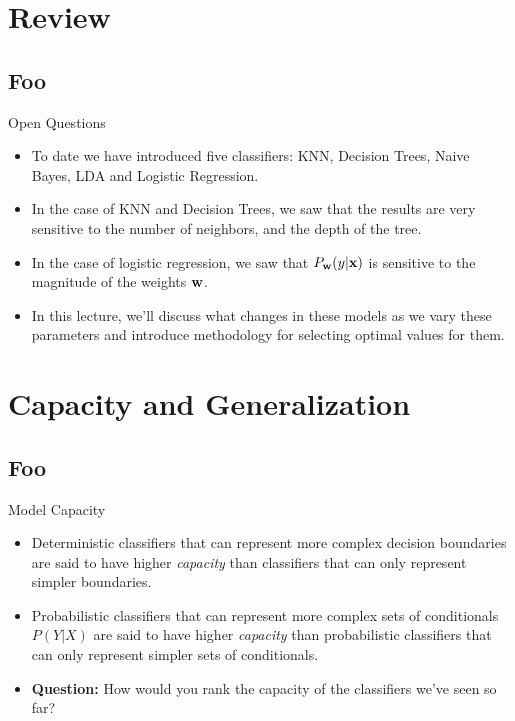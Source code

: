 \documentclass[serif,xcolor=pdftex,dvipsnames,table,hyperref={bookmarks=false}]{beamer}
\begin{document}
\maketitlepage

\section{Review}
\subsection{Foo}

\begin{frame}[t]{Open Questions}

\begin{itemize}
\setlength{\itemsep}{8pt}
\item To date we have introduced five classifiers: KNN, Decision Trees, Naive Bayes, LDA and Logistic Regression.

\pause\item In the case of KNN and Decision Trees, we saw that the results are very sensitive to the number of neighbors, and the depth of the tree. 

\pause\item In the case of logistic regression, we saw that $P_{{\mathbf{w}}}(y|{\mathbf{x}})$ is 
sensitive to the magnitude of the weights ${\mathbf{w}}$. 

\pause\item In this lecture, we'll discuss what changes in these models as we vary these parameters and introduce methodology for selecting optimal values for them.

\end{itemize}

\end{frame}


\section{Capacity and Generalization}
\subsection{Foo}


\begin{frame}[t]{Model Capacity}

\begin{itemize}
\setlength{\itemsep}{12pt}

\item Deterministic classifiers that can represent more complex decision boundaries are said to have higher \textit{capacity} than classifiers that can only represent simpler boundaries. 

\pause\item Probabilistic classifiers that can represent more complex sets of conditionals $P(Y|X)$
are said to have higher \textit{capacity} than probabilistic classifiers that can only represent simpler sets of conditionals. 

\pause\item \textbf{Question:} How would you rank the capacity of the classifiers we've seen so far?

\end{itemize}

\end{frame}
\end{document}
